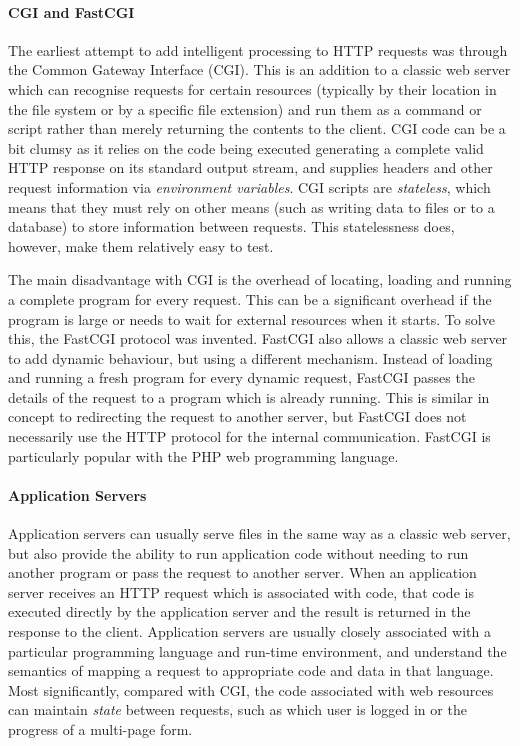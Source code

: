 \paragraph{CGI and FastCGI}
The earliest attempt to add intelligent processing to HTTP requests was through the Common Gateway Interface (CGI). This is an addition to a classic web server which can recognise requests for certain resources (typically by their location in the file system or by a specific file extension) and run them as a command or script rather than merely returning the contents to the client. CGI code can be a bit clumsy  as it relies on the code being executed generating a complete valid HTTP response on its standard output stream, and supplies headers and other request information via \emph{environment variables}. CGI scripts are \emph{stateless}, which means that they must rely on other means (such as writing data to files or to a database) to store information between requests. This statelessness does, however, make them relatively easy to test.

The main disadvantage with CGI is the overhead of locating, loading and running a complete program for every request. This can be a significant overhead if the program is large or needs to wait for external resources when it starts. To solve this, the FastCGI protocol was invented. FastCGI also allows a classic web server to add dynamic behaviour, but using a different mechanism. Instead of loading and running a fresh program for every dynamic request, FastCGI passes the details of the request to a program which is already running. This is similar in concept to redirecting the request to another server, but FastCGI does not necessarily use the HTTP protocol for the internal communication. FastCGI is particularly popular with the PHP web programming language.

\paragraph{Application Servers}
Application servers can usually serve files in the same way as a classic web server, but also provide the ability to run application code without needing to run another program or pass the request to another server. When an application server receives an HTTP request which is associated with code, that code is executed directly by the application server and the result is returned in the response to the client. Application servers are usually closely associated with a particular programming language and run-time environment, and understand the semantics of mapping a request to appropriate code and data in that language. Most significantly, compared with CGI, the code associated with web resources can maintain \emph{state} between requests, such as which user is logged in or the progress of a multi-page form.

